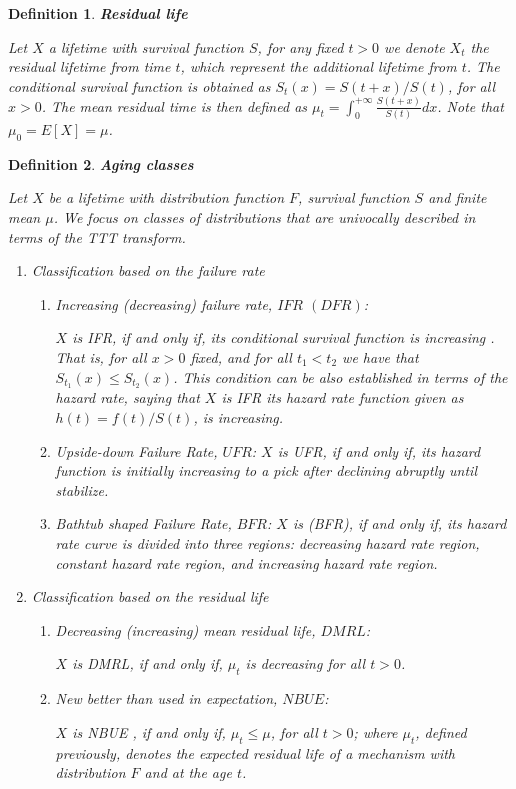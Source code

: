\documentclass[preprint,12pt]{elsarticle}
\newtheorem{dfn}{{\sc Definition}}[section]
\begin{document}
\begin{dfn} {\bf Residual life}

\noindent Let $X$ a lifetime with survival function $S$, for any fixed $t>0$ we denote $X_t$ the residual lifetime from time $t$, which represent the additional lifetime from $t$. The conditional survival function is obtained as $S_t(x)=S(t+x)/S(t)$, for all $x >0$. The mean residual time is then defined as $\mu_t= \int_0^{+\infty} \frac{S(t+x)}{S(t)}dx$. Note that $\mu_0=E[X]=\mu$.
\end{dfn}


\begin{dfn} {\bf Aging classes}

\noindent Let $X$ be a lifetime with distribution function $F$, survival function $S$ and finite mean $\mu$. We focus on classes of distributions  that are univocally described in terms of the TTT transform.

\begin{enumerate}
\item Classification based on the failure rate
\begin{enumerate}
\item Increasing (decreasing) failure rate, $IFR$ $(DFR)$:

\noindent $X$ is {\it IFR}, if and only if, its conditional survival function is increasing . That is, for all $x>0 $ fixed, and for all $t_1 < t_2$ we have that $S_{t_1}(x) \leq S_{t_2}(x) $. This condition can be also established in terms of the hazard rate, saying that $X$ is {\it IFR} its hazard rate function given as $h(t)=f(t)/S(t)$, is increasing.

\item Upside-down Failure Rate, $UFR$:
\noindent $X$ is {\it UFR},  if and only if, its hazard function is initially increasing to a pick after declining abruptly until stabilize.

\item Bathtub shaped Failure Rate, $BFR$:
\noindent $X$ is  ({\it BFR}), if and only if, its  hazard rate curve is divided into three regions: decreasing hazard rate region, constant hazard rate region, and increasing hazard rate region.
\end{enumerate}

\item Classification based on the residual life
\begin{enumerate}
\item Decreasing (increasing) mean residual life, $DMRL$:

 \noindent $X$ is {\it DMRL}, if and only if, $\mu_t$ is decreasing for all $t>0$.

\item New better than used in expectation, $NBUE$:

 \noindent $X$  is {\it NBUE} , if and only if,  $\mu_t \leq  \mu$, for all $t>0$; where $\mu_t$, defined previously, denotes the expected residual life of a mechanism with distribution $F$ and at the age $t$.

\end{enumerate}
\end{enumerate}
\end{dfn}
\end{document}
